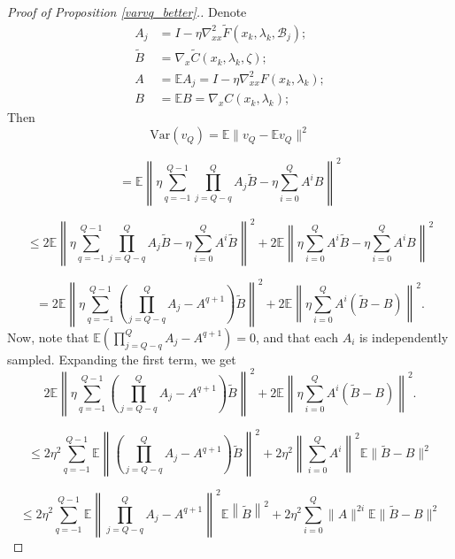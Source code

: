 \documentclass[11pt, twoside]{report}
\begin{document}
\begin{proof}[Proof of Proposition \ref{varvq_better}.]
Denote
\begin{align*}
    A_j &= I- \eta \nabla_{xx}^2 \tilde{F}(x_k,\lambda_k, \mathcal{B}_j); \\
    \tilde{B} &= \nabla_x \tilde{C} (x_k,\lambda_k,\zeta); \\
    A &= \mathbb{E}A_j = I- \eta \nabla_{xx}^2 F(x_k,\lambda_k); \\
    B &= \mathbb{E}B = \nabla_x C (x_k,\lambda_k);
\end{align*}
Then 
\[\mathrm{Var}(v_Q) = \mathbb{E} \|v_Q - \mathbb{E}v_Q \|^2\]

\[= \mathbb{E} \left\|\eta \sum_{q=-1}^{Q-1} \prod_{j = Q-q}^Q A_j \tilde{B} - \eta \sum_{i=0}^Q A^i B \right\|^2\]

\[\leq 2 \mathbb{E} \left\| \eta \sum_{q=-1}^{Q-1} \prod_{j = Q-q}^Q A_j \tilde{B} - \eta \sum_{i=0}^Q A^i \tilde{B} \right\|^2 + 2\mathbb{E} \left\| \eta \sum_{i=0}^Q A^i \tilde{B} - \eta \sum_{i=0}^Q A^i B \right\|^2 \]

\[= 2 \mathbb{E} \left\| \eta \sum_{q=-1}^{Q-1} \left( \prod_{j = Q-q}^Q A_j - A^{q+1} \right) \tilde{B} \right\|^2 + 2\mathbb{E} \left\| \eta \sum_{i=0}^Q A^i (\tilde{B} - B) \right\|^2. \]
Now, note that $\mathbb{E}\left( \prod_{j = Q-q}^Q A_j - A^{q+1} \right) = 0$, and that each $A_i$ is independently sampled. Expanding the first term, we get
\[2 \mathbb{E} \left\| \eta \sum_{q=-1}^{Q-1} \left( \prod_{j = Q-q}^Q A_j - A^{q+1} \right) \tilde{B} \right\|^2 + 2\mathbb{E} \left\| \eta \sum_{i=0}^Q A^i (\tilde{B} - B) \right\|^2. \]

\[\leq 2 \eta^2 \sum_{q=-1}^{Q-1} \mathbb{E} \left\| \left( \prod_{j = Q-q}^Q A_j - A^{q+1} \right) \tilde{B} \right\|^2 + 2\eta^2 \left\| \sum_{i=0}^Q  A^i \right\|^{2} \mathbb{E} \|\tilde{B} - B\|^2 \]

\[\leq 2 \eta^2 \sum_{q=-1}^{Q-1} \mathbb{E} \left\| \prod_{j = Q-q}^Q A_j - A^{q+1} \right \|^2 \mathbb{E} \left\| \tilde{B} \right\|^2 + 2\eta^2 \sum_{i=0}^Q \|  A \|^{2i} \mathbb{E} \|\tilde{B} - B\|^2 \]


\end{proof}
\end{document}
